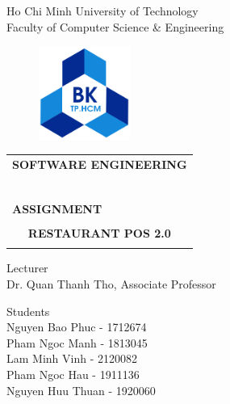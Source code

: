 \documentclass[11pt]{article}
\begin{document}
\begin{titlepage}
\begin{center}
\noindent Ho Chi Minh University of Technology\\
Faculty of Computer Science \& Engineering\
\end{center}

\vspace{1cm}

\begin{figure}[h!]
\begin{center}
\includegraphics[width=3cm]{hcmut.png}
\end{center}
\end{figure}

\vspace{1cm}


\begin{center}
\begin{tabular}{c}
\multicolumn{1}{l}{\textbf{{\Large SOFTWARE ENGINEERING}}}\\
~~\\
\hline
\\
\multicolumn{1}{l}{\textbf{{\Large ASSIGNMENT}}}\\
\\
\textbf{{\Huge RESTAURANT POS 2.0}}\\
\\
\hline
\end{tabular}
\end{center}

\vspace{3cm}

\begin{minipage}[t]{0.60\linewidth}
Lecturer \\ 
Dr. Quan Thanh Tho, Associate Professor
\end{minipage}
\begin{minipage}[t]{0.40\linewidth}
Students\\
Nguyen Bao Phuc - 1712674\\
Pham Ngoc Manh - 1813045\\
Lam Minh Vinh - 2120082\\
Pham Ngoc Hau - 1911136\\
Nguyen Huu Thuan - 1920060\\
\end{minipage}

\end{titlepage}
\end{document}
